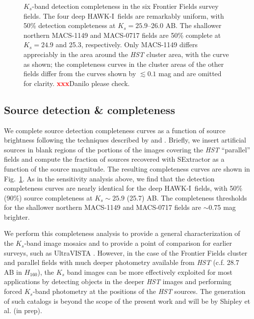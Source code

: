 \documentclass[preprint2]{aastex6}
\newcommand\xxx{{\textcolor{red}{\bf xxx}}}
\gdef\HAWKI{\mbox{HAWK-I}}
\begin{document}
\begin{figure}[!t]
\caption{$K_s$-band detection completeness in the six Frontier Fields survey fields. The four deep \HAWKI\ fields are remarkably uniform, with 50\% detection completeness at $K_s=25.9$--26.0 AB.  The shallower northern MACS-1149 and MACS-0717 fields are 50\% complete at $K_s=24.9$ and 25.3, respectively.  Only MACS-1149 differs appreciably in the area around the \textit{HST} cluster area, with the curve as shown;  the completeness curves in the cluster areas of the other fields differ from the curves shown by $\lesssim0.1$ mag and are omitted for clarity. \xxx{Danilo please check}.
\label{fig:completeness}}  
\end{figure}

\subsection{Source detection \& completeness}
\label{s:completeness}


We complete source detection completeness curves as a function of source brightness following the techniques described by \cite{whitaker:nmbs} and \cite{muzzin:13}.  Briefly, we insert artificial sources in blank regions of the portions of the images covering the \textit{HST} ``parallel'' fields and compute the fraction of sources recovered with SExtractor as a function of the source magnitude.  The resulting completeness curves are shown in Fig.~\ref{fig:completeness}.   As in the sensitivity analysis above, we find that the detection completeness curves are nearly identical for the deep \HAWKI\ fields, with 50\% (90\%) source completeness at $K_s\sim25.9$ (25.7) AB.  The completeness thresholds for the shallower northern MACS-1149 and MACS-0717 fields are $\sim$0.75 mag brighter.

We perform this completeness analysis to provide a general characterization of the $K_s$-band image mosaics and to provide a point of comparison for earlier surveys, such as UltraVISTA \citep{muzzin:13}.  However, in the case of the Frontier Fields cluster and parallel fields with much deeper photometry available from \textit{HST} (c.f. 28.7 AB in $H_{160}$), the $K_s$ band images can be more effectively exploited for most applications by detecting objects in the deeper \textit{HST} images and performing forced $K_s$-band photometry at the positions of the \textit{HST} sources.  The generation of such catalogs is beyond the scope of the present work and will be by Shipley et al. (in prep).
\end{document}
